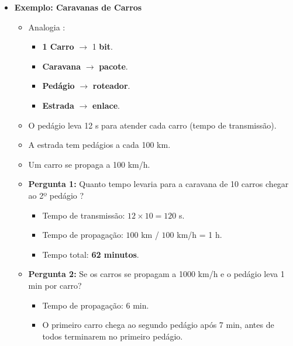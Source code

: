 \begin{itemize}[left=0.5cm, align=left, nosep]
\begin{itemize}[left=0.5cm, nosep, label=$\hookrightarrow$]
            \end{itemize} 
                        
        \item \textbf{Exemplo: Caravanas de Carros}
            
            \begin{itemize}[left=0.5cm, nosep, label=$\hookrightarrow$]
                \item Analogia :
                \begin{itemize}[left=0.5cm, nosep, label=$-$]
                    \item \textbf{1 Carro} $\rightarrow$ 1 \textbf{bit}.
                    \item \textbf{Caravana} $\rightarrow$ \textbf{pacote}.
                    \item \textbf{Pedágio} $\rightarrow$ \textbf{roteador}.
                    \item \textbf{Estrada} $\rightarrow$ \textbf{enlace}.
                \end{itemize}

                \item O pedágio leva 12 s para atender cada carro (tempo de transmissão). 
                \item A estrada tem pedágios a cada 100 km. 
                \item Um carro se propaga a 100 km/h. 
                \item \textbf{Pergunta 1:} Quanto tempo levaria para a caravana de 10 carros chegar ao 2º pedágio ? 
                \begin{itemize}[left=0.5cm, nosep, label=$-$]
                    \item Tempo de transmissão: $12 \times 10 = 120$ s.
                    \item Tempo de propagação: $100$ km / $100$ km/h = 1 h.
                    \item Tempo total: \textbf{62 minutos}.
                \end{itemize}

                \item \textbf{Pergunta 2:} Se os carros se propagam a 1000 km/h e o pedágio leva 1 min por carro? 
                \begin{itemize}[left=0.5cm, nosep, label=$-$]
                    \item Tempo de propagação: 6 min.
                    \item O primeiro carro chega ao segundo pedágio após 7 min, antes de todos terminarem no primeiro pedágio.
                \end{itemize}
            \end{itemize} 
                        

\end{itemize}
